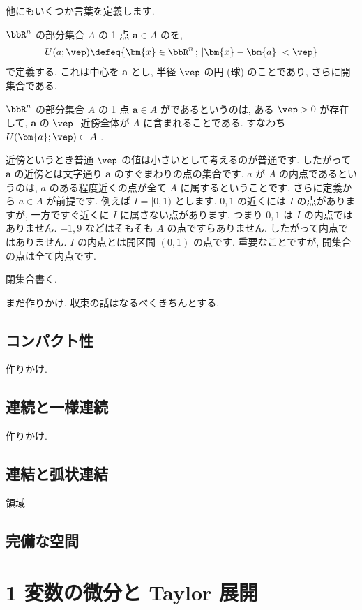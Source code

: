 \documentclass[openany, a4paper, oneside]{jsbook}
\begin{document}
他にもいくつか言葉を定義します.
\begin{defn}
 $\bbR^n$ の部分集合 $A$ の 1 点 $\bm{a}\in A$ のを,
    \begin{align}
        U ( a ; \vep )
        \defeq
        \{ \bm{x} \in \bbR^n \, ; \, |\bm{x} - \bm{a}| < \vep \}
    \end{align}
で定義する. これは中心を $\bm{a}$ とし, 半径 $\vep$ の円 (球) のことであり, さらに開集合である.
\end{defn}
\begin{defn}
 $\bbR^n$ の部分集合 $A$ の 1 点 $\bm{a}\in A$ がであるというのは,
ある $\vep>0$ が存在して,  $\bm{a}$ の $\vep$ -近傍全体が $A$ に含まれることである.
すなわち $U (\bm{a};\vep) \subset A$ .
\end{defn}
近傍というとき普通 $\vep$ の値は小さいとして考えるのが普通です.
したがって $\bm{a}$ の近傍とは文字通り $\bm{a}$ のすぐまわりの点の集合です.
 $a$ が $A$ の内点であるというのは,  $a$ のある程度近くの点が全て $A$ に属するということです.
さらに定義から $a \in A$ が前提です.
例えば $I=[0,1)$ とします.
 $0,1$ の近くには $I$ の点がありますが, 一方ですぐ近くに $I$ に属さない点があります.
つまり $0,1$ は $I$ の内点ではありません.
 $-1,9$ などはそもそも $A$ の点ですらありません.
したがって内点ではありません.
 $I$ の内点とは開区間 $(0,1)$ の点です.
重要なことですが, 開集合の点は全て内点です.

閉集合書く.

まだ作りかけ. 収束の話はなるべくきちんとする.
\subsection{コンパクト性}

作りかけ.
\subsection{連続と一様連続}

作りかけ.
\subsection{連結と弧状連結}

領域
\subsection{完備な空間}

\section{1 変数の微分と Taylor 展開}
\end{document}
